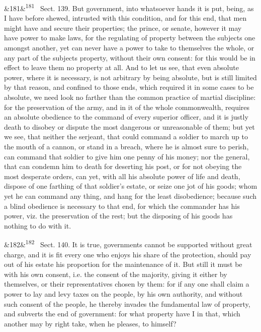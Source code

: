 \documentclass[12pt]{article}
\newcommand{\para}[1][]{\par\noindent\ifx&#1&\else\textsuperscript{\footnotesize #1}~\fi}
\begin{document}
\para[181] Sect. 139. But government, into whatsoever hands it is put, being, as I have before shewed, intrusted with this condition, and for this end, that men might have and secure their properties; the prince, or senate, however it may have power to make laws, for the regulating of property between the subjects one amongst another, yet can never have a power to take to themselves the whole, or any part of the subjects property, without their own consent: for this would be in effect to leave them no property at all. And to let us see, that even absolute power, where it is necessary, is not arbitrary by being absolute, but is still limited by that reason, and confined to those ends, which required it in some cases to be absolute, we need look no farther than the common practice of martial discipline: for the preservation of the army, and in it of the whole commonwealth, requires an absolute obedience to the command of every superior officer, and it is justly death to disobey or dispute the most dangerous or unreasonable of them; but yet we see, that neither the serjeant, that could command a soldier to march up to the mouth of a cannon, or stand in a breach, where he is almost sure to perish, can command that soldier to give him one penny of his money; nor the general, that can condemn him to death for deserting his post, or for not obeying the most desperate orders, can yet, with all his absolute power of life and death, dispose of one farthing of that soldier's estate, or seize one jot of his goods; whom yet he can command any thing, and hang for the least disobedience; because such a blind obedience is necessary to that end, for which the commander has his power, viz. the preservation of the rest; but the disposing of his goods has nothing to do with it.

\para[182] Sect. 140. It is true, governments cannot be supported without great charge, and it is fit every one who enjoys his share of the protection, should pay out of his estate his proportion for the maintenance of it. But still it must be with his own consent, i.e. the consent of the majority, giving it either by themselves, or their representatives chosen by them: for if any one shall claim a power to lay and levy taxes on the people, by his own authority, and without such consent of the people, he thereby invades the fundamental law of property, and subverts the end of government: for what property have I in that, which another may by right take, when he pleases, to himself?
\end{document}
